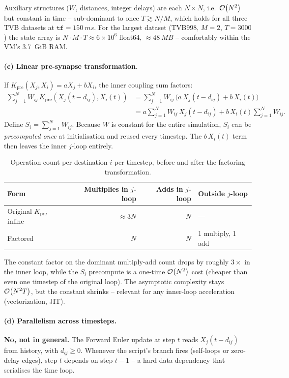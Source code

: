 \documentclass[11pt, a4paper]{article}
\begin{document}
Auxiliary structures ($W$, distances, integer delays) are each $N \times N$,
i.e.\ $\mathcal{O}\!\left(N^2\right)$ but constant in time -- sub-dominant to  once
$T \gtrsim N/M$, which holds for all three TVB datasets at
$\mathtt{tf} = \SI{150}{ms}$. For the largest dataset (TVB998, $M=2$,
$T=3000$) the state array is $N \cdot M \cdot T \approx 6 \times 10^6$
float64, $\approx \SI{48}{MB}$ -- comfortably within the VM's
\SI{3.7}{GiB} RAM.

\paragraph{(c) Linear pre-synapse transformation.}
If $K_{\text{pre}}(X_j, X_i) = a X_j + b X_i$, the inner coupling sum
factors:
\[
\begin{aligned}
\sum_{j=1}^{N} W_{ij}\,K_{\text{pre}}(X_j(t-d_{ij}), X_i(t))
&= \sum_{j=1}^{N} W_{ij}\,\bigl(a\,X_j(t-d_{ij}) + b\,X_i(t)\bigr) \\
&= a \sum_{j=1}^{N} W_{ij}\,X_j(t-d_{ij}) + b\,X_i(t) \sum_{j=1}^{N} W_{ij}.
\end{aligned}
\]
Define $S_i = \sum_{j=1}^{N} W_{ij}$. Because $W$ is constant for the
entire simulation, $S_i$ can be \emph{precomputed once} at initialisation
and reused every timestep. The $b\,X_i(t)$ term then leaves the inner
$j$-loop entirely.

\begin{table}[H]
\centering
\caption{Operation count per destination $i$ per timestep, before and after the factoring transformation.}
\label{tab:q1c-ops}
\begin{tabular}{lrrl}
\toprule
Form & Multiplies in $j$-loop & Adds in $j$-loop & Outside $j$-loop \\
\midrule
Original $K_{\text{pre}}$ inline & $\approx 3N$  & $N$ & --- \\
Factored                         & $N$           & $N$ & 1 multiply, 1 add \\
\bottomrule
\end{tabular}
\end{table}

The constant factor on the dominant multiply-add count drops by roughly
$3\times$ in the inner loop, while the $S_i$ precompute is a one-time
$\mathcal{O}\!\left(N^2\right)$ cost (cheaper than even one timestep of the original loop).
The asymptotic complexity stays $\mathcal{O}\!\left(N^2 T\right)$, but the constant
shrinks -- relevant for any inner-loop acceleration (vectorization, JIT).

\paragraph{(d) Parallelism across timesteps.}
\textbf{No, not in general.} The Forward Euler update at step $t$ reads
$X_j(t - d_{ij})$ from history, with $d_{ij} \geq 0$. Whenever the
script's branch
 fires
(self-loops or zero-delay edges), step $t$ depends on step $t-1$ -- a
hard data dependency that serialises the time loop.
\end{document}
